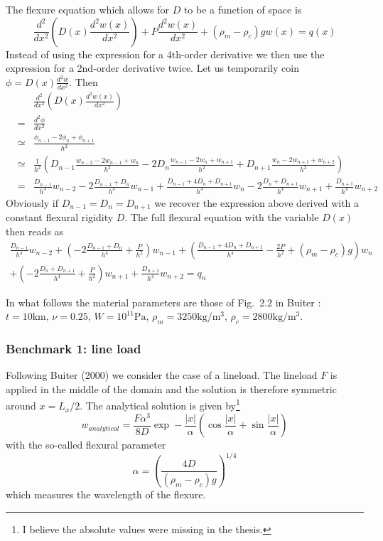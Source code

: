 The flexure equation which allows for $D$ to be a function of space is 
\[
\frac{d^2}{dx^2} \left( D(x) \frac{d^2w(x)}{dx^2} \right) + P \frac{d^2w(x)}{dx^2} 
+ (\rho_m-\rho_c)g w(x) = q(x)
\]
Instead of using the expression for a 4th-order derivative we then use the expression 
for a 2nd-order derivative twice. 
Let us temporarily coin $\phi=D(x) \frac{d^2w}{dx^2}$.
Then
\begin{eqnarray}
&&\frac{d^2}{dx^2} \left( D(x) \frac{d^2w(x)}{dx^2} \right)\\
&=& \frac{d^2 \phi}{dx^2} \\
&\simeq& \frac{\phi_{n-1}-2\phi_n+\phi_{n+1}}{h^2} \nonumber\\
&\simeq& \frac{1}{h^2}
\left(
D_{n-1} \frac{w_{n-2}-2w_{n-1}+w_{n}}{h^2}
-2 D_n \frac{w_{n-1}-2w_n+w_{n+1}}{h^2}
+ D_{n+1} \frac{w_{n}-2w_{n+1}+w_{n+2}}{h^2}
\right) \nonumber\\
&=&
\frac{D_{n-1}}{h^4} w_{n-2}
-2\frac{D_{n-1}+D_n}{h^4} w_{n-1}
+\frac{D_{n-1}+4D_n+D_{n+1}  }{h^4} w_n
-2\frac{D_{n}+D_{n+1}}{h^4} w_{n+1}
+\frac{D_{n+1}}{h^4} w_{n+2} \nonumber
\end{eqnarray}
Obviously if $D_{n-1}=D_n=D_{n+1}$ we recover the 
expression above derived with a constant flexural 
rigidity $D$.
The full flexural equation with the variable $D(x)$ then reads as
\begin{eqnarray}
\frac{D_{n-1}}{h^4} w_{n-2}
+\left(-2\frac{D_{n-1}+D_{n}}{h^4}+\frac{P}{h^2}\right)w_{n-1}
+\left(\frac{D_{n-1}+4D_{n}+D_{n+1}}{h^4}-\frac{2P}{h^2} +(\rho_m-\rho_c)g \right)w_n \nonumber\\
+\left(-2\frac{D_{n}+D_{n+1}}{h^4}+\frac{P}{h^2}\right)w_{n+1}
+\frac{D_{n+1}}{h^4} w_{n+2} = q_n
\end{eqnarray}

In what follows the material parameters are those of Fig.~2.2 in Buiter \cite{buiter_thesis}:
$t=10\si{\km}$, $\nu=0.25$, $W=10^{11}\si{\pascal}$, $\rho_m=3250\si{\kg\per\cubic\metre}$, 
$\rho_c=2800\si{\kg\per\cubic\metre}$.

\subsubsection*{Benchmark 1: line load}

Following Buiter (2000) \cite{buiter_thesis} we consider the case of a lineload.
The lineload $F$ is applied in the middle of the domain and the solution 
is therefore symmetric around $x=L_x/2$.
The analytical solution is given by\footnote{I believe the absolute values
were missing in the thesis.} 
\[
w_{analytical} = \frac{F \alpha^3}{8 D} \exp -\frac{|x|}{\alpha}
\left(
\cos \frac{|x|}{\alpha} + \sin \frac{|x|}{\alpha} 
\right)
\]
with the so-called flexural parameter  
\[
\alpha=\left(\frac{4D}{(\rho_m-\rho_c)g}\right)^{1/4}
\]
which measures the wavelength of the flexure.

